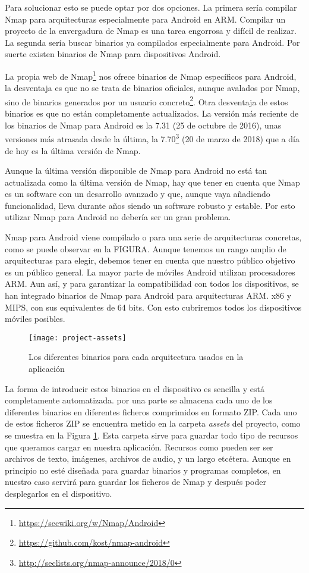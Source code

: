 Para solucionar esto se puede optar por dos opciones. La primera sería compilar Nmap para arquitecturas especialmente para Android en ARM. Compilar un proyecto de la envergadura de Nmap es una tarea engorrosa y difícil de realizar. La segunda sería buscar binarios ya compilados especialmente para Android. Por suerte existen binarios de Nmap para dispositivos Android.

La propia web de Nmap\footnote{\url{https://secwiki.org/w/Nmap/Android}} nos ofrece binarios de Nmap específicos para Android, la desventaja es que no se trata de binarios oficiales, aunque avalados por Nmap, sino de binarios generados por un usuario concreto\footnote{\url{https://github.com/kost/nmap-android}}. Otra desventaja de estos binarios es que no están completamente actualizados. La versión más reciente de los binarios de Nmap para Android es la 7.31 (25 de octubre de 2016), unas versiones más atrasada desde la última, la 7.70\footnote{\url{http://seclists.org/nmap-announce/2018/0}} (20 de marzo de 2018) que a día de hoy es la última versión de Nmap.

Aunque la última versión disponible de Nmap para Android no está tan actualizada como la última versión de Nmap, hay que tener en cuenta que Nmap es un software con un desarrollo avanzado y que, aunque vaya añadiendo funcionalidad, lleva durante años siendo un software robusto y estable. Por esto utilizar Nmap para Android no debería ser un gran problema.

Nmap para Android viene compilado o para una serie de arquitecturas concretas, como se puede observar en la FIGURA. Aunque tenemos un rango amplio de arquitecturas para elegir, debemos tener en cuenta que nuestro público objetivo es un público general. La mayor parte de móviles Android utilizan procesadores ARM. Aun así, y para garantizar la compatibilidad con todos los dispositivos, se han integrado binarios de Nmap para Android para arquitecturas ARM. x86 y MIPS, con sus equivalentes de 64 bits. Con esto cubriremos todos los dispositivos móviles posibles.

\begin{figure}[H]
	\centering
	\texttt{[image: project-assets]}
	\caption{Los diferentes binarios para cada arquitectura usados en la aplicación}
	\label{fig:project-assets}
\end{figure}

La forma de introducir estos binarios en el dispositivo es sencilla y está completamente automatizada. por una parte se almacena cada uno de los diferentes binarios en diferentes ficheros comprimidos en formato ZIP. Cada uno de estos ficheros ZIP se encuentra metido en la carpeta \textit{assets} del proyecto, como se muestra en la Figura \ref{fig:project-assets}. Esta carpeta sirve para guardar todo tipo de recursos que queramos cargar en nuestra aplicación. Recursos como pueden ser ser archivos de texto, imágenes, archivos de audio, y un largo etcétera. Aunque en principio no esté diseñada para guardar binarios y programas completos, en nuestro caso servirá para guardar los ficheros de Nmap y después poder desplegarlos en el dispositivo.

